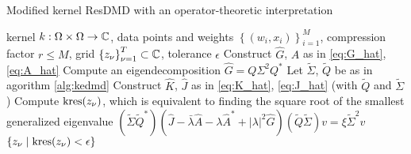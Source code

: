 \begin{algorithm}
    \caption{Modified kernel ResDMD with an operator-theoretic interpretation}
    \label{alg:kresdmd_correct}
    \begin{algorithmic}[1]
        \Require kernel $k : \Omega \times \Omega \to \mathbb{C}$, data points and weights 
            $\left\{ (w_i, x_i) \right\}_{i=1}^M$, compression factor $r \leq M$,
            grid $\left\{ z_\nu \right\}_{\nu=1}^T \subset \mathbb{C}$,
            tolerance $\epsilon$
        \State Construct $\widehat{G}$, $\widehat{A}$ as in \ref{eq:G_hat}, \ref{eq:A_hat}
        \State Compute an eigendecomposition $\widehat{G} = Q \Sigma^2 Q^*$
        \State Let $\widetilde{\Sigma}$, $\widetilde{Q}$ be as in agorithm \ref{alg:kedmd}
        \State Construct $\widehat{ K }$, $\widehat{ J }$ as in \ref{eq:K_hat}, 
            \ref{eq:J_hat} (with $\widetilde{ Q }$ and $\widetilde{ \Sigma }$)
        \State Compute $\text{kres} (z_\nu)$, which is equivalent 
            to finding the square root of the smallest generalized eigenvalue 
            $\left( \widetilde{ \Sigma } \widetilde{ Q }^* \right) 
            \left( 
                \widehat{ J }
                - \bar{\lambda} \widehat{ A } 
                - \lambda \widehat{ A }^* 
                + | \lambda |^2 \widehat{ G }
            \right)
            \left( \widetilde{ Q } \widetilde{ \Sigma } \right) v
            = \xi \widetilde{ \Sigma }^{2} v$
        \EndFor
        \State \Return $\left\{ z_\nu \mid \text{kres} (z_\nu) < \epsilon \right\}$
    \end{algorithmic}
\end{algorithm}


